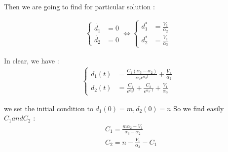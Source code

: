\documentclass{article}
\begin{document}
	Then we are going to find for particular solution : 
	
	
	\begin{align*}
		\begin{cases}
			\dot{d_1} &= 0 \\
			\dot{d_2} &= 0
		\end{cases} \iff 
		\begin{cases}
			d_1^* &= \frac{V_1}{\alpha_2} \\
			d_2^* &= \frac{V_1}{\alpha_3}
		\end{cases}
	\end{align*}
	
	In clear, we have : 
	\begin{align*}
		\begin{cases}
			d_1(t) &= \frac{C_1(\alpha_3-\alpha_2)}{\alpha_2e^{\alpha_2t}}+ \frac{V_1}{\alpha_2}\\
			d_2(t) &= \frac{C_1}{e^{\alpha_2t}} + \frac{C_2}{e^{\alpha_3 \cdot t}} + \frac{V_1}{\alpha_3}
		\end{cases}
	\end{align*}
	
	we set the initial condition to \newline 
	$d_1(0)=m, d_2(0)=n$ So we find easily $C_1 and C_2$ : 
	\begin{align*}
		&C_1=\frac{m\alpha_2-V_1}{\alpha_3-\alpha_2} \\
		&C_2=n-\frac{V_1}{\alpha_3} - C_1
	\end{align*}
	
	\newpage
	
	\printbibliography
\end{document}

